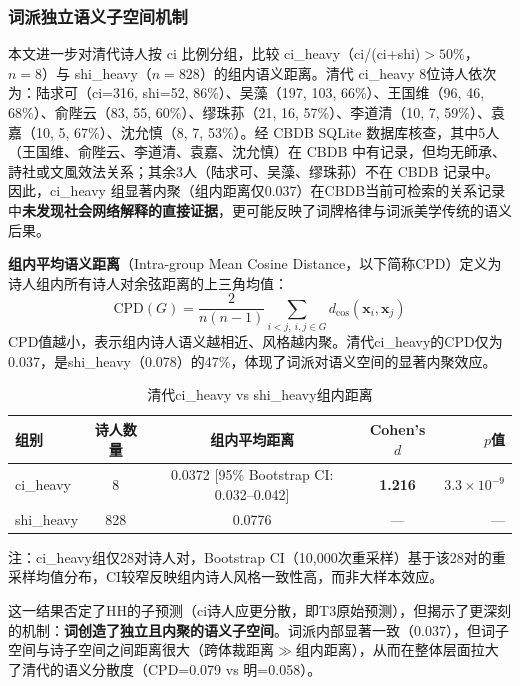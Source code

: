 \documentclass[12pt,a4paper]{article}
\numberwithin{equation}{section}
\begin{document}
\subsubsection{词派独立语义子空间机制}

本文进一步对清代诗人按 ci 比例分组，比较 ci\_heavy（ci/(ci+shi)$>50\%$，$n=8$）与 shi\_heavy（$n=828$）的组内语义距离。清代 ci\_heavy 8位诗人依次为：陆求可（ci=316, shi=52, 86\%）、吴藻（197, 103, 66\%）、王国维（96, 46, 68\%）、俞陛云（83, 55, 60\%）、缪珠荪（21, 16, 57\%）、李道清（10, 7, 59\%）、袁嘉（10, 5, 67\%）、沈允慎（8, 7, 53\%）。经 CBDB SQLite 数据库核查，其中5人（王国维、俞陛云、李道清、袁嘉、沈允慎）在 CBDB 中有记录，但均无師承、詩社或文風效法关系；其余3人（陆求可、吴藻、缪珠荪）不在 CBDB 记录中。因此，ci\_heavy 组显著内聚（组内距离仅0.037）在CBDB当前可检索的关系记录中\textbf{未发现社会网络解释的直接证据}，更可能反映了词牌格律与词派美学传统的语义后果。

\textbf{组内平均语义距离}（Intra-group Mean Cosine Distance，以下简称CPD）定义为诗人组内所有诗人对余弦距离的上三角均值：
\begin{equation}
\text{CPD}(G) = \frac{2}{n(n-1)}\sum_{i<j,\ i,j\in G} d_{\cos}(\mathbf{x}_i,\mathbf{x}_j)
\end{equation}
CPD值越小，表示组内诗人语义越相近、风格越内聚。清代ci\_heavy的CPD仅为0.037，是shi\_heavy（0.078）的47\%，体现了词派对语义空间的显著内聚效应。

\begin{table}[htbp]
  \centering
  \caption{清代ci\_heavy vs shi\_heavy组内距离}
  \label{tab:qing-cpd}
  \begin{tabular}{lcccr}
    \toprule
    组别     & 诗人数量 & 组内平均距离                           & Cohen's $d$ & $p$值 \\
    \midrule
    ci\_heavy  &   8 & 0.0372 [95\% Bootstrap CI: 0.032--0.042] & \textbf{1.216} & $3.3\times10^{-9}$ \\
    shi\_heavy & 828 & 0.0776                                 & ---         & ---    \\
    \bottomrule
  \end{tabular}
\end{table}

注：ci\_heavy组仅28对诗人对，Bootstrap CI（10,000次重采样）基于该28对的重采样均值分布，CI较窄反映组内诗人风格一致性高，而非大样本效应。

这一结果否定了HH的子预测（ci诗人应更分散，即T3原始预测），但揭示了更深刻的机制：\textbf{词创造了独立且内聚的语义子空间}。词派内部显著一致（0.037），但词子空间与诗子空间之间距离很大（跨体裁距离$\gg$组内距离），从而在整体层面拉大了清代的语义分散度（CPD=0.079 vs 明=0.058）。
\end{document}
